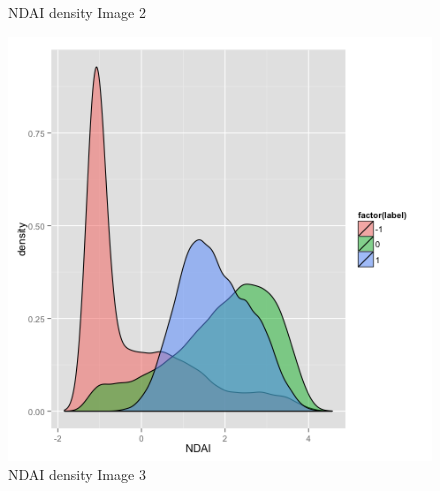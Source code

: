 \documentclass{article}\usepackage[]{graphicx}\usepackage[]{color}
\begin{document}
\begin{figure}[h]
  \caption{NDAI density Image 2}\label{}
\endminipage\hfill
{}%
  \includegraphics[width=\linewidth]{NDAI3.png}
  \caption{NDAI density Image 3}\label{}
\endminipage
\end{figure}
\end{document}
